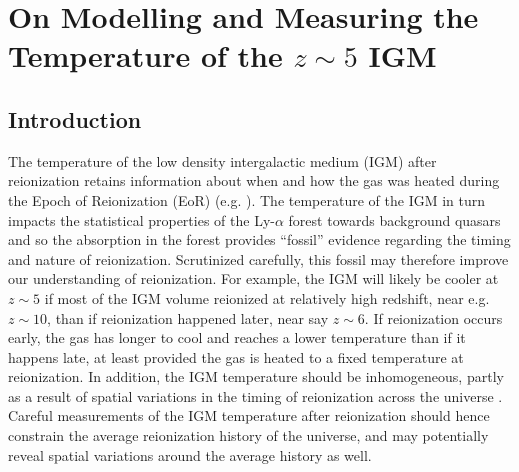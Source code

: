 

\ifpdf
    \graphicspath{{igm_temperature/figures/PNG/}{bubble_finding/figures/PDF/}{bubble_finding/figures/}}
\else
    \graphicspath{{igm_temperature/figures/EPS/}{example_chapter/figures/}}
\fi


\chapter{On Modelling and Measuring the Temperature of the $z \sim 5$ IGM}\label{sec:IGMTemperature}

\section{Introduction} \label{sec:IGMTemperatureIntro}

The temperature of the low density intergalactic medium (IGM) after reionization retains information about
when and how the gas was heated during the Epoch of Reionization (EoR) (e.g. \citealt{1994MNRAS.266..343M,Hui:1997dp,Theuns:2002yc,Hui:2003hn}).
The temperature of the IGM in turn
impacts the statistical properties of the Ly-$\alpha$ forest towards background quasars and so the absorption in the
forest provides ``fossil'' evidence regarding the timing and nature of reionization. Scrutinized carefully, this
fossil may therefore improve our understanding of reionization. For example, the IGM will likely be cooler at $z \sim 5$ if most of the IGM volume
reionized at relatively high redshift, near e.g. $z \sim 10$, than if reionization happened later, near say $z \sim 6$. If reionization occurs
early, the gas has longer to cool and reaches a lower temperature than if it happens late, at least provided the gas is heated to a fixed
temperature at reionization. In addition, the IGM temperature should be inhomogeneous, partly as a result of spatial
variations in the timing of reionization across the universe \citep{Trac:2008yz,Cen:2009bg,Furlanetto:2009kr}. Careful measurements of the IGM temperature after reionization should hence
constrain the average reionization history of the universe, and may potentially reveal spatial variations around the average 
history as well.


